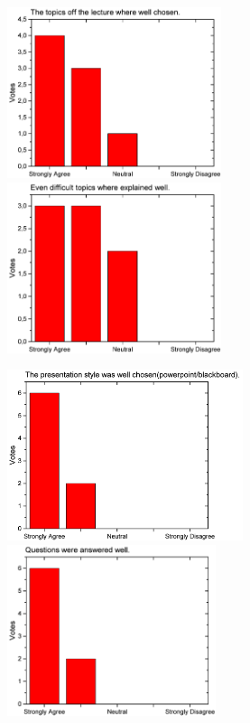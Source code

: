 \begin{figure}[H]
  \begin{minipage}{.48\linewidth}
    \centering
      {\includegraphics[height=50mm]{figures/n/Graph97.pdf}}
      {\includegraphics[height=50mm]{figures/n/Graph98.pdf}}
  \end{minipage}\quad
  \begin{minipage}{.48\linewidth}
    \centering
      {\includegraphics[height=50mm]{figures/n/Graph99.pdf}}
      {\includegraphics[height=50mm]{figures/n/Graph100.pdf}}
  \end{minipage}
\end{figure}
